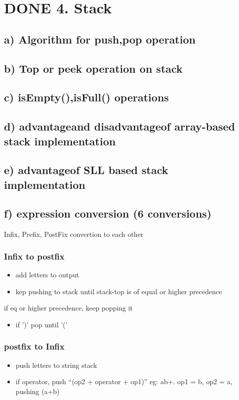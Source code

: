 \documentclass[11pt]{article}
\begin{document}
\section{{\bfseries\sffamily DONE} 4. Stack}
\label{sec:orgb437be6}
\subsection{a) Algorithm for push,pop operation}
\label{sec:org96470e5}
\subsection{b) Top or peek operation on stack}
\label{sec:org955562e}
\subsection{c) isEmpty(),isFull() operations}
\label{sec:orgca2ea51}
\subsection{d) advantageand disadvantageof array-based stack implementation}
\label{sec:org7fc4bac}
\subsection{e) advantageof SLL based stack implementation}
\label{sec:org9ed0433}
\subsection{f) expression conversion (6 conversions)}
\label{sec:orga4503ed}
Infix, Prefix, PostFix convertion to each other
\subsubsection{Infix to postfix}
\label{sec:org33d2ea2}
\begin{itemize}
\item add letters to output
\item kep pushing to stack until stack-top is of equal or higher precedence
\end{itemize}
if eq or higher precedence, keep popping it
\begin{itemize}
\item if ')' pop until '('
\end{itemize}
\subsubsection{postfix to Infix}
\label{sec:orga49ace4}
\begin{itemize}
\item push letters to string stack
\item if operator, push ``(op2 + operator + op1)''
eg: ab+. op1 = b, op2 = a, pushing (a+b)
\end{itemize}
\end{document}
